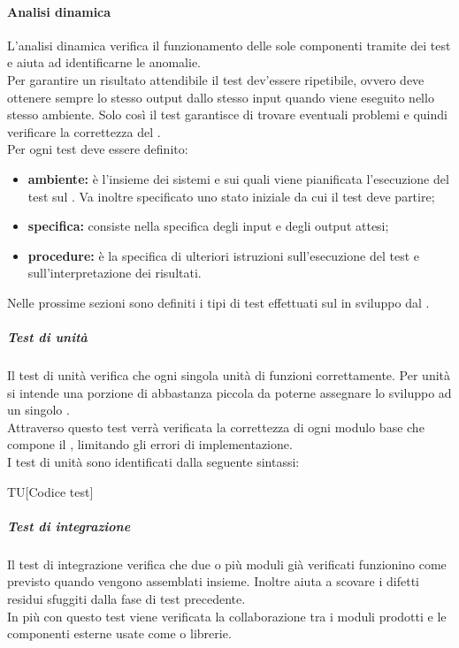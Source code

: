 		\paragraph{Analisi dinamica}
		L'analisi dinamica verifica il funzionamento delle sole componenti  tramite dei test e aiuta ad identificarne le anomalie. \\
		Per garantire un risultato attendibile il test dev'essere ripetibile, ovvero deve ottenere sempre lo stesso output dallo stesso input quando viene eseguito nello stesso ambiente. Solo così il test garantisce di trovare eventuali problemi e quindi verificare la correttezza del  . \\
		Per ogni test deve essere definito:
		\begin{itemize}
			\item \textbf{ambiente:} è l'insieme dei sistemi  e  sui quali viene pianificata l'esecuzione del test sul . Va inoltre specificato uno stato iniziale da cui il test deve partire;
			\item \textbf{specifica:} consiste nella specifica degli input e degli output attesi;
			\item \textbf{procedure:} è la specifica di ulteriori istruzioni sull'esecuzione del test e sull'interpretazione dei risultati.
		\end{itemize}
		Nelle prossime sezioni sono definiti i tipi di test effettuati sul   in sviluppo dal .
			\subparagraph{Test di unità}
			Il test di unità verifica che ogni singola unità di  funzioni correttamente. Per unità si intende una porzione di  abbastanza piccola da poterne assegnare lo sviluppo ad un singolo \PR. \\
			Attraverso questo test verrà verificata la correttezza di ogni modulo base che compone il , limitando gli errori di implementazione. \\
			I test di unità sono identificati dalla seguente sintassi:
			\begin{center}
				TU[Codice test]
			\end{center}
			\subparagraph{Test di integrazione}
			Il test di integrazione verifica che due o più moduli già verificati funzionino come previsto quando vengono assemblati insieme. Inoltre aiuta a scovare i difetti residui sfuggiti dalla fase di test precedente. \\
			In più con questo test viene verificata la collaborazione tra i moduli prodotti e le componenti esterne usate come  o librerie. \\
